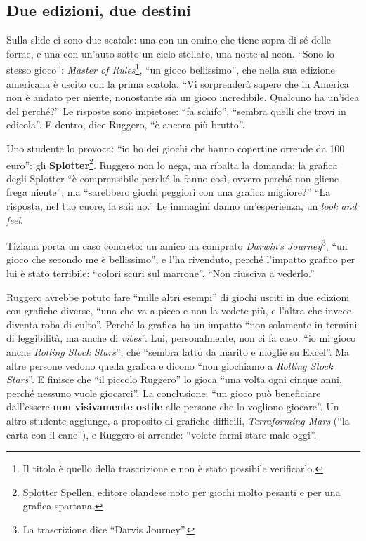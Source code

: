 \subsection{Due edizioni, due destini}

Sulla slide ci sono due scatole: una con un omino che tiene sopra di sé delle forme, e
una con un'auto sotto un cielo stellato, una notte al neon. ``Sono lo stesso gioco'':
\emph{Master of Rules}\footnote{Il titolo è quello della trascrizione e non è stato
possibile verificarlo.}, ``un gioco bellissimo'', che nella sua edizione americana è
uscito con la prima scatola. ``Vi sorprenderà sapere che in America non è andato per
niente, nonostante sia un gioco incredibile. Qualcuno ha un'idea del perché?'' Le
risposte sono impietose: ``fa schifo'', ``sembra quelli che trovi in edicola''. E
dentro, dice Ruggero, ``è ancora più brutto''.

Uno studente lo provoca: ``io ho dei giochi che hanno copertine orrende da 100 euro'':
gli \textbf{Splotter}\footnote{Splotter Spellen, editore olandese noto per giochi
molto pesanti e per una grafica spartana.}. Ruggero non lo nega, ma ribalta la
domanda: la grafica degli Splotter ``è comprensibile perché la fanno così, ovvero perché
non gliene frega niente''; ma ``sarebbero giochi peggiori con una grafica migliore?'' ``La
risposta, nel tuo cuore, la sai: no.'' Le immagini danno un'esperienza, un \emph{look
and feel}.

Tiziana porta un caso concreto: un amico ha comprato \emph{Darwin's Journey}\footnote{
La trascrizione dice ``Darvis Journey''.}, ``un gioco che secondo me è bellissimo'', e
l'ha rivenduto, perché l'impatto grafico per lui è stato terribile: ``colori scuri sul
marrone''. ``Non riusciva a vederlo.''

Ruggero avrebbe potuto fare ``mille altri esempi'' di giochi usciti in due edizioni con
grafiche diverse, ``una che va a picco e non la vedete più, e l'altra che invece diventa
roba di culto''. Perché la grafica ha un impatto ``non solamente in termini di
leggibilità, ma anche di \emph{vibes}''. Lui, personalmente, non ci fa caso: ``io mi
gioco anche \emph{Rolling Stock Stars}'', che ``sembra fatto da marito e moglie su
Excel''. Ma altre persone vedono quella grafica e dicono ``non giochiamo a \emph{Rolling
Stock Stars}''. E finisce che ``il piccolo Ruggero'' lo gioca ``una volta ogni cinque
anni, perché nessuno vuole giocarci''. La conclusione: ``un gioco può beneficiare
dall'essere \textbf{non visivamente ostile} alle persone che lo vogliono giocare''.
Un altro studente aggiunge, a proposito di grafiche difficili, \emph{Terraforming
Mars} (``la carta con il cane''), e Ruggero si arrende: ``volete farmi stare male
oggi''.

